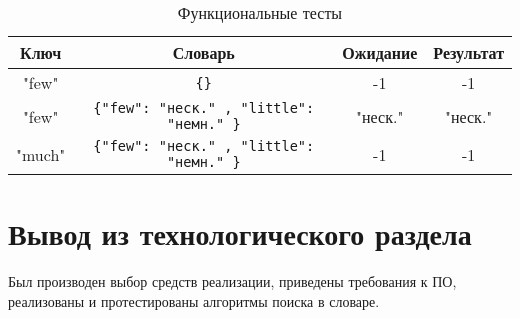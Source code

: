 \begin{table}[h!]
	\begin{center}
		\caption{\label{tab:test_rec} Функциональные тесты}
		\begin{tabular}{|c | c | c | c |}
			\hline
			Ключ & Словарь & Ожидание & Результат \\
			\hline
			"few" & \texttt{\{\}} & -1 & -1 \\
			"few" & \texttt{\{"few": "неск."\,, "little": "немн." \}} & "неск." & "неск." \\
			"much" & \texttt{\{"few": "неск."\,, "little": "немн." \}} & -1 & -1 \\
			\hline
		\end{tabular}
	\end{center}
	\end{table}



\section{Вывод из технологического раздела}

Был производен выбор средств реализации, приведены требования к ПО, реализованы и протестированы алгоритмы поиска в словаре.
